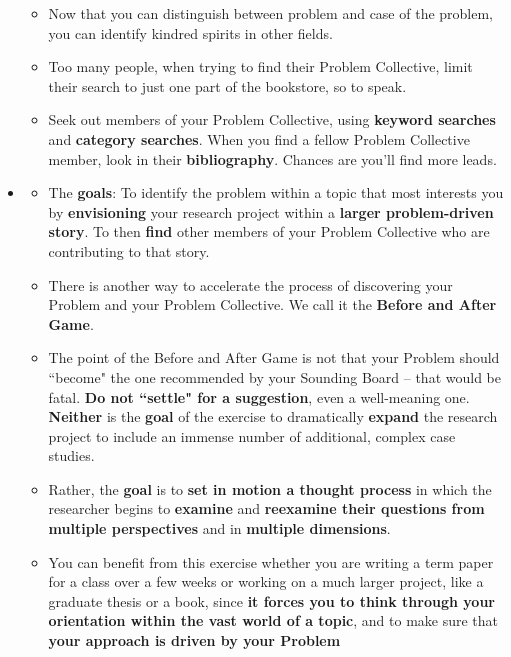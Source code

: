 \documentclass[11pt]{article}
\begin{document}
\begin{itemize}
\begin{exercise}
\begin{itemize}
\item Now that you can distinguish between problem and case of the problem, you can identify kindred spirits in other fields. 

\item Too many people, when trying to find their Problem Collective, limit their search to just one part of the bookstore, so to speak. 

\item Seek out members of your Problem Collective, using \textbf{keyword searches} and \textbf{category searches}. When you find a fellow Problem Collective member, look in their \textbf{bibliography}. Chances are you’ll find more leads.
\end{itemize}
\end{exercise}

\item  \begin{exercise}
\begin{itemize}
\item The \textbf{goals}: To identify the problem within a topic that most interests you by \textbf{envisioning} your research project within a \textbf{larger problem-driven story}. To then \textbf{find} other members of your Problem Collective who are contributing to that story.

\item There is another way to accelerate the process of discovering your Problem and your Problem Collective. We call it the \textbf{Before and After Game}.

\item The point of the Before and After Game is not that your Problem should ``become" the one recommended by your Sounding Board -- that would be fatal. \textbf{Do not ``settle" for a suggestion}, even a well-meaning one. \textbf{Neither} is the \textbf{goal} of the exercise to dramatically \textbf{expand} the research project to include an immense number of additional, complex case studies.

\item Rather, the \textbf{goal} is to \textbf{set in motion a thought process} in which the researcher begins to \textbf{examine} and \textbf{reexamine their questions from multiple perspectives} and in \textbf{multiple dimensions}. 

\item You can benefit from this exercise whether you are writing a term paper for a class over a few weeks or working on a much larger project, like a graduate thesis or a book, since \textbf{it forces you to think through your orientation within the vast world of a topic}, and to make sure that \textbf{your approach is driven by your Problem} 


\end{itemize}
\end{exercise}
\end{itemize}
\end{document}
